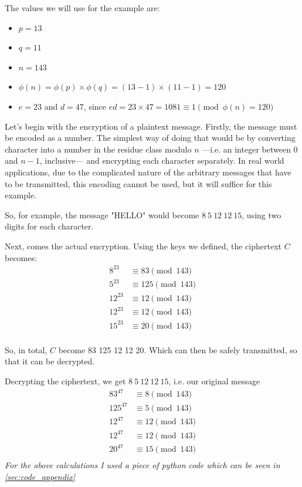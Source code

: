 \documentclass[12pt, titlepage]{article}
\begin{document}
The values we will use for the example are: 
\begin{itemize}
    \item $p=13$ 
    \item $q=11$
    \item $n=143$ 
    \item $\phi (n) = \phi(p) \times \phi(q) = (13-1) \times (11-1) = 120$ 
    \item $e = 23$ and $d = 47$, since $ed = 23 \times 47 = 1081 \equiv 1 \pmod{\phi(n)=120}$
\end{itemize}

Let's begin with the encryption of a plaintext message. Firstly, the message must be encoded
as a number. The simplest way of doing that would be by converting character into a number
in the residue class modulo $n$ ---i.e. an integer between $0$ and $n-1$, inclusive--- and
encrypting each character separately.  In real world applications, due to the complicated
nature of the arbitrary messages that have to be transmitted, this encoding cannot be used,
but it will suffice for this example.

So, for example, the message "HELLO" would become $8\ 5\ 12\ 12\ 15$, using two digits for
each character.

Next, comes the actual encryption. Using the keys we defined, the ciphertext $C$ becomes: 
\begin{align*}
    8^{23}  &\equiv 83 \pmod{143} \\
    5^{23}  &\equiv 125 \pmod{143} \\
    12^{23}  &\equiv 12 \pmod{143} \\
    12^{23}  &\equiv 12 \pmod{143} \\
    15^{23}  &\equiv 20 \pmod{143} \\
\end{align*}

So, in total, $C$ become 83 125 12 12 20. Which can then be safely transmitted, so that it can be decrypted.   

Decrypting the ciphertext, we get $8\ 5\ 12\ 12\ 15$, i.e. our original message
\begin{align*}
    83^{47}  &\equiv 8 \pmod{143} \\
    125^{47}  &\equiv 5 \pmod{143} \\
    12^{47}  &\equiv 12 \pmod{143} \\
    12^{47}  &\equiv 12 \pmod{143} \\
    20^{47}  &\equiv 15 \pmod{143} \\
\end{align*}
\textit{For the above calculations I used a piece of python code which can be seen in
\autoref{sec:code_appendix}}
\end{document}

